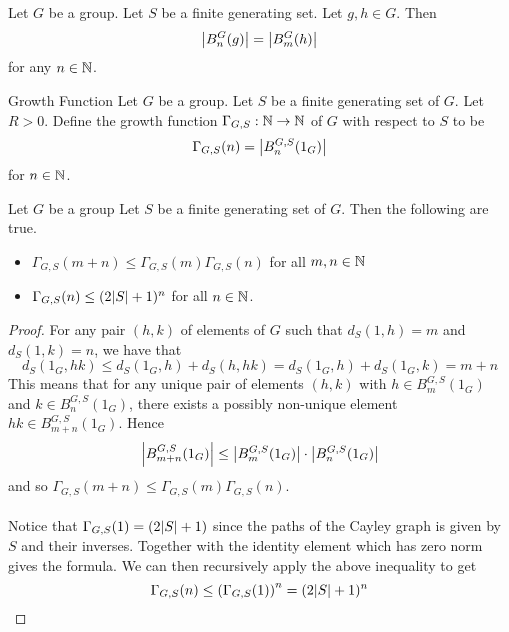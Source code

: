 \documentclass[a4paper]{article}
\begin{document}
\begin{prp}{}{} Let $G$ be a group. Let $S$ be a finite generating set. Let $g,h\in G$. Then $$\abs{B_n^G(g)}=\abs{B_m^G(h)}$$ for any $n\in\mathbb{N}$. 
\end{prp}

\begin{defn}{Growth Function}{} Let $G$ be a group. Let $S$ be a finite generating set of $G$. Let $R>0$. Define the growth function $\Gamma_{G,S}:\mathbb{N}\to\mathbb{N}$ of $G$ with respect to $S$ to be $$\Gamma_{G,S}(n)=\abs{B_n^{G,S}(1_G)}$$ for $n\in\mathbb{N}$. 
\end{defn}

\begin{prp}{}{} Let $G$ be a group Let $S$ be a finite generating set of $G$. Then the following are true. 
\begin{itemize}
\item $\Gamma_{G,S}(m+n)\leq\Gamma_{G,S}(m)\Gamma_{G,S}(n)$ for all $m,n\in\mathbb{N}$
\item $\Gamma_{G,S}(n)\leq(2\abs{S}+1)^n$ for all $n\in\mathbb{N}$. 
\end{itemize} \tcbline
\begin{proof}
For any pair $(h,k)$ of elements of $G$ such that $d_S(1,h)=m$ and $d_S(1,k)=n$, we have that $$d_S(1_G,hk)\leq d_S(1_G,h)+d_S(h,hk)=d_S(1_G,h)+d_S(1_G,k)=m+n$$ This means that for any unique pair of elements $(h,k)$ with $h\in B_m^{G,S}(1_G)$ and $k\in B_n^{G,S}(1_G)$, there exists a possibly non-unique element $hk\in B_{m+n}^{G,S}(1_G)$. Hence $$\abs{B_{m+n}^{G,S}(1_G)}\leq\abs{B_m^{G,S}(1_G)}\cdot\abs{B_n^{G,S}(1_G)}$$ and so $\Gamma_{G,S}(m+n)\leq\Gamma_{G,S}(m)\Gamma_{G,S}(n)$. \\~\\

Notice that $\Gamma_{G,S}(1)=(2\abs{S}+1)$ since the paths of the Cayley graph is given by $S$ and their inverses. Together with the identity element which has zero norm gives the formula. We can then recursively apply the above inequality to get $$\Gamma_{G,S}(n)\leq\left(\Gamma_{G,S}(1)\right)^n=(2\abs{S}+1)^n$$
\end{proof}
\end{prp}
\end{document}
